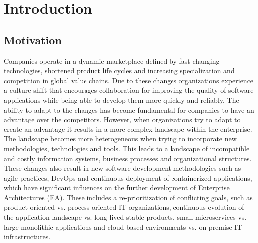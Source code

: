 


\chapter{Introduction}\label{chapter:introduction}


\section{Motivation}
Companies operate in a dynamic marketplace defined by fast-changing technologies, shortened product life cycles and increasing specialization and competition in global value chains. 
Due to these changes organizations experience a culture shift that encourages collaboration for improving the quality of software applications while being able to develop them more quickly and reliably.
The ability to adapt to the changes has become fundamental for companies to have an advantage over the competitors. 
However, when organizations try to adapt to create an advantage it results in a more complex landscape within the enterprise. \cite{Ahlemann2012}
The landscape becomes more heterogeneous when trying to incorporate new methodologies, technologies and tools. This leads to a landscape of incompatible and costly information systems, business processes and organizational structures. \cite{Ahlemann2012}
These changes also result in new software development methodologies such as agile practices, DevOps and continuous deployment of containerized applications, which have significant influences on the further development of Enterprise Architectures (EA). These includes a re-prioritization of conflicting goals, such as product-oriented vs. process-oriented IT organizations, continuous evolution of the application landscape vs. long-lived stable products, small microservices vs. large monolithic applications and cloud-based environments vs. on-premise IT infrastructures.


